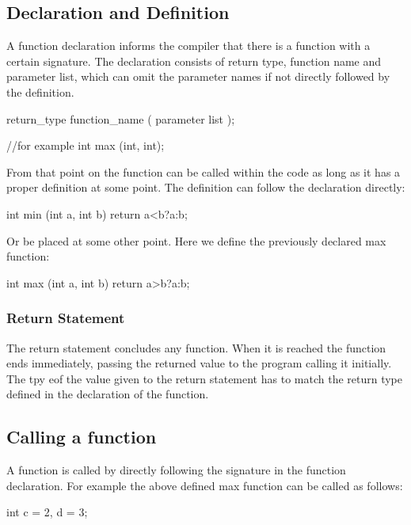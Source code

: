 \documentclass[10pt,a4paper]{scrartcl}
\begin{document}
\begin{multicols*}{2}
\subsection{Declaration and Definition}
\label{sec:DeclarationAndDefinition}

A function declaration informs the compiler that there is a function with a certain signature. The declaration consists of return type, function name and parameter list, which can omit the parameter names if not directly followed by the definition.

\begin{TPCpp}
return_type function_name ( parameter list );

//for example
int max (int, int);
\end{TPCpp}

From that point on the function can be called within the code as long as it has a proper definition at some point. The definition can follow the declaration directly:

\begin{TPCpp}
int min (int a, int b){
	return a<b?a:b;
}
\end{TPCpp}

Or be placed at some other point. Here we define the previously declared max function:

\begin{TPCpp}
int max (int a, int b){
	return a>b?a:b;
}
\end{TPCpp}

\subsubsection{Return Statement}
\label{sec:ReturnStatement}

The return statement concludes any function. When it is reached the function ends immediately, passing the returned value to the program calling it initially. The tpy eof the value given to the return statement has to match the return type defined in the declaration of the function.

\subsection{Calling a function}
\label{sec:CallingAFunction}

A function is called by directly following the signature in the function declaration. For example the above defined max function can be called as follows:

\begin{TPCpp}
int c = 2, d = 3;


\end{TPCpp}
\end{multicols*}
\end{document}
